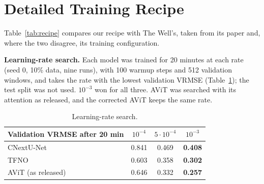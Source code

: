 \documentclass[11pt]{article}
\begin{document}
\section{Detailed Training Recipe}
\label{app:recipe}

Table~\ref{tab:recipe} compares our recipe with The Well's, taken from its paper and, where the two disagree, its
training configuration.

\textbf{Learning-rate search.} Each model was trained for 20 minutes at each rate (seed 0, 10\% data, nine runs),
with 100 warmup steps and 512 validation windows, and takes the rate with the lowest validation VRMSE
(Table~\ref{tab:lr}); the test split was not used. $10^{-3}$ won for all three. AViT was searched with its attention
as released, and the corrected AViT keeps the same rate.

\begin{table}[!htbp]
\centering\small\setlength{\tabcolsep}{4pt}
\begin{tabular}{@{}lccc@{}}
\toprule
Validation VRMSE after 20 min & $10^{-4}$ & $5\cdot10^{-4}$ & $10^{-3}$ \\
\midrule
CNextU-Net & 0.841 & 0.469 & \textbf{0.408} \\
TFNO & 0.603 & 0.358 & \textbf{0.302} \\
AViT (as released) & 0.646 & 0.332 & \textbf{0.257} \\
\bottomrule
\end{tabular}
\caption{Learning-rate search.}
\label{tab:lr}
\end{table}
\end{document}
